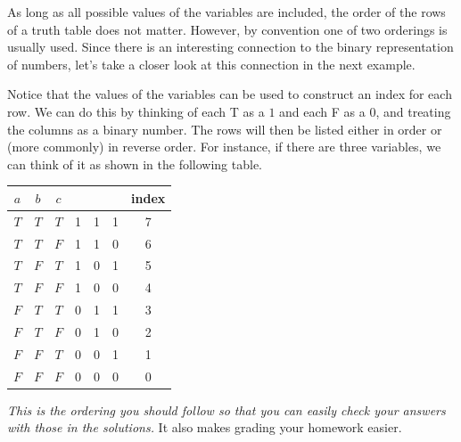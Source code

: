 \begin{rem}
As long as all possible values of the variables are included,
the order of the rows of a truth table does not matter. 
However,  by convention one of two orderings is usually used.  
Since there is an interesting connection to the binary representation of numbers, 
let's take a closer look at this connection in the next example.
\end{rem}

\begin{exa}\label{exa:rowOrder}
Notice that the values of the variables can be used to construct an index for each row.  
We can do this by thinking of each T as a $1$ 
and each F as a $0$, and treating the columns as a binary number.
The rows will then be listed either in order or (more commonly) in 
reverse order.
For instance, if there are three variables, we can think of it as shown
in the following table.

\begin{center}
\begin{tabular}{|ccc||ccc|c|}
\hline $a$ & $b$ & $c$ & &  &&index \\
\hline
$T$ & $T$ & $T$ &1&1&1&7\\
$T$ & $T$ & $F$ &1&1&0&6\\
$T$ & $F$ & $T$ &1&0&1&5\\
$T$ & $F$ & $F$ &1&0&0&4\\
$F$ & $T$ & $T$ &0&1&1&3\\
$F$ & $T$ & $F$ &0&1&0&2\\
$F$ & $F$ & $T$ &0&0&1&1\\
$F$ & $F$ & $F$ &0&0&0&0\\
\hline
\end{tabular}
\end{center}
{\em This is the ordering you should follow so that you can easily check your answers with those in
the solutions.}  
It also makes grading your homework easier.


\end{exa}
